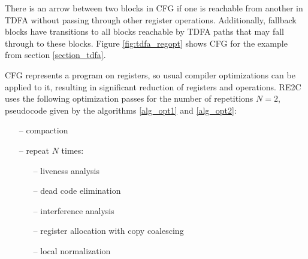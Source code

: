 \documentclass[]{article}
\begin{document}
There is an arrow between two blocks in CFG if one is reachable from another in TDFA without passing through other register operations.
Additionally, fallback blocks have transitions to all blocks reachable by TDFA paths that may fall through to these blocks.
Figure \ref{fig:tdfa_regopt} shows CFG for the example from section \ref{section_tdfa}.
\medskip

CFG represents a program on registers, so usual compiler optimizations can be applied to it,
resulting in significant reduction of registers and operations.
RE2C uses the following optimization passes for the number of repetitions $N=2$,
pseudocode given by the algorithms \ref{alg_opt1} and \ref{alg_opt2}:
\medskip

\begin{itemize}
    \item[--] compaction
    \item[--] repeat $N$ times:
    \begin{itemize}[label=\alph*.]
        \item[--] liveness analysis
        \item[--] dead code elimination
        \item[--] interference analysis
        \item[--] register allocation with copy coalescing
        \item[--] local normalization
    \end{itemize}
\end{itemize}
\medskip

\end{document}

